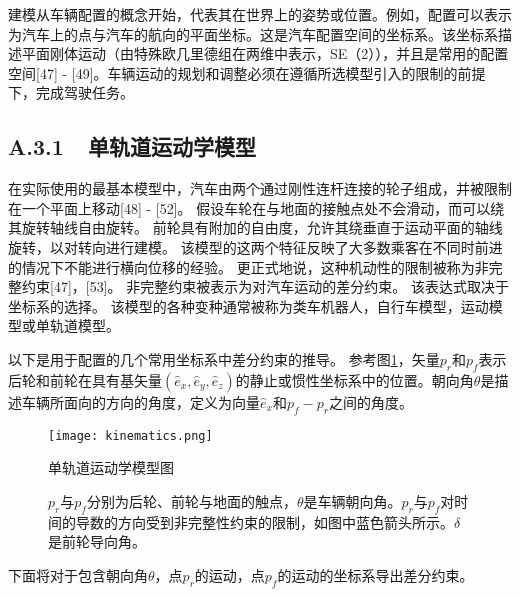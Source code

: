 建模从车辆配置的概念开始，代表其在世界上的姿势或位置。例如，配置可以表示为汽车上的点与汽车的航向的平面坐标。这是汽车配置空间的坐标系。该坐标系描述平面刚体运动（由特殊欧几里德组在两维中表示，SE（2）），并且是常用的配置空间[47] - [49]。车辆运动的规划和调整必须在遵循所选模型引入的限制的前提下，完成驾驶任务。

\subsection*{A.3.1\ \ 单轨道运动学模型}
在实际使用的最基本模型中，汽车由两个通过刚性连杆连接的轮子组成，并被限制在一个平面上移动[48] - [52]。 假设车轮在与地面的接触点处不会滑动，而可以绕其旋转轴线自由旋转。 前轮具有附加的自由度，允许其绕垂直于运动平面的轴线旋转，以对转向进行建模。 该模型的这两个特征反映了大多数乘客在不同时前进的情况下不能进行横向位移的经验。 更正式地说，这种机动性的限制被称为非完整约束[47]，[53]。 非完整约束被表示为对汽车运动的差分约束。 该表达式取决于坐标系的选择。 该模型的各种变种通常被称为类车机器人，自行车模型，运动模型或单轨道模型。

以下是用于配置的几个常用坐标系中差分约束的推导。 参考图\ref{fig:kinematics}，矢量$p_r$和$p_f$表示后轮和前轮在具有基矢量$(\hat{e}_x, \hat{e}_y, \hat{e}_z)$的静止或惯性坐标系中的位置。朝向角$\theta$是描述车辆所面向的方向的角度，定义为向量$\hat{e}_x$和$p_f-p_r$之间的角度。
\begin{figure}
\centering
\texttt{[image: kinematics.png]}
\caption{单轨道运动学模型图}
\caption*{$p_r$与$p_f$分别为后轮、前轮与地面的触点，$\theta$是车辆朝向角。$p_r$与$p_f$对时间的导数的方向受到非完整性约束的限制，如图中蓝色箭头所示。$\delta$是前轮导向角。}
\label{fig:kinematics}
\end{figure}

下面将对于包含朝向角$\theta$，点$p_r$的运动，点$p_f$的运动的坐标系导出差分约束。

